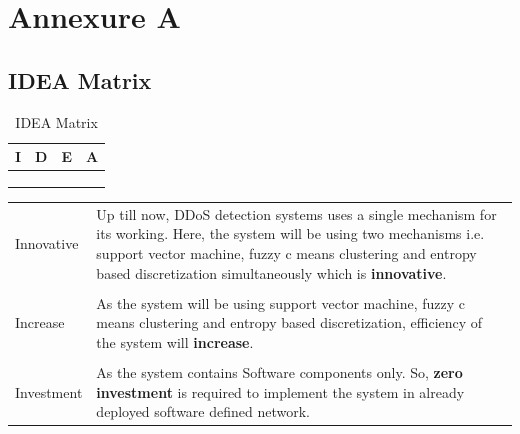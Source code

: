 \documentclass[12pt,a4paper,final]{report}
\DeclareRobustCommand{\gobblefive}[5]{}
\newcommand*{\SkipTocEntry}{\addtocontents{toc}{\gobblefive}}
\begin{document}
\SkipTocEntry\chapter{Annexure A}
\thispagestyle{empty}
\newpage
\SkipTocEntry\section{IDEA Matrix}
\begin{table}[h]
\caption{IDEA Matrix}

\begin{center}
\begin{tabular}{|>{\bf}M{2.5cm}||>{\bf}M{2.5cm}||>{\bf}M{2.5cm}||>{\bf}M{2.5cm}|}
\hline
{}
I & D & E & A \\ \hline
{} &   &  &  \\ \hline
{} &   &  &  \\ \hline
{} &   &  &  \\ \hline
\end{tabular}
\end{center}
\end{table}

\begin{center}
\begin{tabular}{|m{2cm}|m{7cm}|}
\hline
Innovative & Up till now, DDoS detection systems uses a single mechanism for its working. Here, the system will be using two mechanisms i.e. support vector machine, fuzzy c means clustering and entropy based discretization simultaneously which is \textbf{innovative}. \\

&\\

Increase & As the system will be using support vector machine, fuzzy c means clustering and entropy based discretization, efficiency of the system will \textbf{increase}. \\

&\\

Investment & As the system contains Software components only. So, \textbf{zero investment} is required to implement the system in already deployed software defined network. \\

\hline
\end{tabular}
\end{center}
\end{document}
